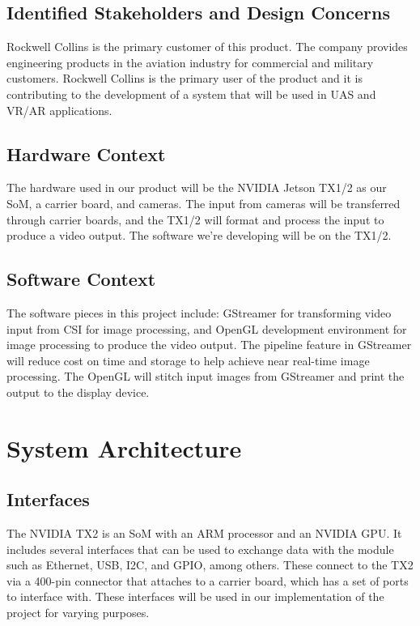 \documentclass[letterpaper,10pt,serif,draftclsnofoot,onecolumn,compsoc,titlepage]{IEEEtran}
\begin{document}
\subsection{Identified Stakeholders and Design Concerns}

Rockwell Collins is the primary customer of this product. The company provides 
engineering products in the aviation industry for commercial and military customers. 
Rockwell Collins is the primary user of the product and it is contributing 
to the development of a system that will be used in UAS and VR/AR applications. \\

\subsection{Hardware Context}

The hardware used in our product will be the NVIDIA Jetson TX1/2 as our SoM, 
a carrier board, and cameras. The input from cameras will be transferred through 
carrier boards, and the TX1/2 will format and process the input to produce a 
video output. The software we're developing will be on the TX1/2. \\

\subsection{Software Context}

The software pieces in this project include: GStreamer for transforming video input 
from CSI for image processing, and OpenGL development environment for image processing 
to produce the video output. The pipeline feature in GStreamer will reduce 
cost on time and storage to help achieve near real-time image processing. The OpenGL 
will stitch input images from GStreamer and print the output to the display device. \\

\section{System Architecture}

\subsection{Interfaces}
The NVIDIA TX2 is an SoM with an ARM processor and an NVIDIA GPU. It includes several interfaces that can be used to exchange data with the module such as Ethernet, USB, I2C, and GPIO, among others. These connect to the TX2 via a 400-pin connector that attaches to a carrier board, which has a set of ports to interface with. These interfaces will be used in our implementation of the project for varying purposes.
\end{document}
